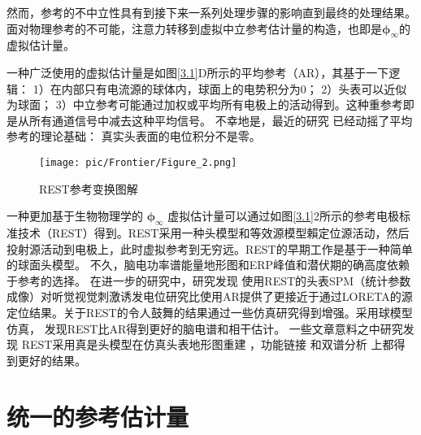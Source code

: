 然而，参考的不中立性具有到接下来一系列处理步骤的影响直到最终的处理结果。面对物理参考的不可能，注意力转移到虚拟中立参考估计量的构造，也即是$\mathbf{\phi}_{\infty}$的虚拟估计量。

一种广泛使用的虚拟估计量是如图\ref{3.1}D所示的平均参考（AR），其基于一下逻辑：
1）在内部只有电流源的球体内，球面上的电势积分为0； 2）头表可以近似为球面； 3）中立参考可能通过加权或平均所有电极上的活动得到。这种重参考即是从所有通道信号中减去这种平均信号。
不幸地是，最近的研究 已经动摇了平均参考的理论基础： 真实头表面的电位积分不是零。
\begin{figure}[!ht]
	\centering
	\texttt{[image: pic/Frontier/Figure\_2.png]}
	\caption{REST参考变换图解}
	\label{3.2}
\end{figure}
一种更加基于生物物理学的 $\mathbf{\phi}_{\infty}$ 虚拟估计量可以通过如图\ref{3.1}2所示的参考电极标准技术（REST）得到。REST采用一种头模型和等效源模型賴定位源活动，然后投射源活动到电极上，此时虚拟参考到无穷远。REST的早期工作是基于一种简单的球面头模型。 不久，脑电功率谱能量地形图和ERP峰值和潜伏期的确高度依赖于参考的选择。 在进一步的研究中，研究发现 使用REST的头表SPM（统计参数成像）对听觉视觉刺激诱发电位研究比使用AR提供了更接近于通过LORETA的源定位结果。关于REST的令人鼓舞的结果通过一些仿真研究得到增强。采用球模型仿真，
 发现REST比AR得到更好的脑电谱和相干估计。 一些文章意料之中研究发现 REST采用真是头模型在仿真头表地形图重建 ，功能链接 
和双谱分析  上都得到更好的结果。

\section{统一的参考估计量}
